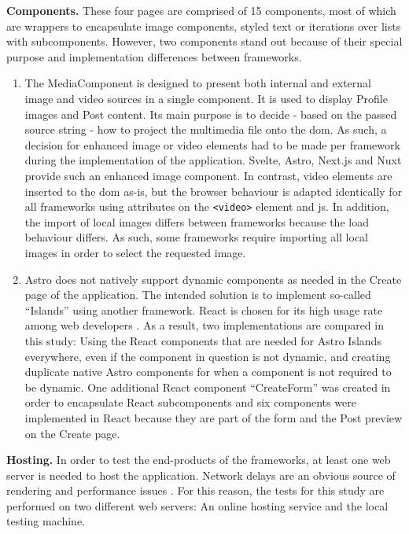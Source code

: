 \documentclass[a4paper, 12pt]{article}
\begin{document}
\textbf{Components.} These four pages are comprised of 15 components, most of which are wrappers to encapsulate image components, styled text or iterations over lists with subcomponents.
However, two components stand out because of their special purpose and implementation differences between frameworks.

\begin{enumerate}
  \item The MediaComponent is designed to present both internal and external image and video sources in a single component.
  It is used to display Profile images and Post content.
  Its main purpose is to decide - based on the passed source string - how to project the multimedia file onto the \acrshort{dom}.
  As such, a decision for enhanced image or video elements had to be made per framework during the implementation of the application.
  Svelte, Astro, Next.js and Nuxt provide such an enhanced image component.
  In contrast, video elements are inserted to the \acrshort{dom} as-is, but the browser behaviour is adapted identically for all frameworks using attributes on the \verb|<video>| element and \acrlong{js}.
  In addition, the import of local images differs between frameworks because the load behaviour differs.
  As such, some frameworks require importing all local images in order to select the requested image.
  \item Astro does not natively support dynamic components as needed in the Create page of the application.
  The intended solution is to implement so-called \enquote{Islands} using another framework.
  React is chosen for its high usage rate among web developers \citep{stateOfJs2023}.
  As a result, two implementations are compared in this study: Using the React components that are needed for Astro Islands everywhere, even if the component in question is not dynamic, and creating duplicate native Astro components for when a component is not required to be dynamic.
  One additional React component \enquote{CreateForm} was created in order to encapsulate React subcomponents and six components were implemented in React because they are part of the form and the Post preview on the Create page.
\end{enumerate}

\textbf{Hosting.} In order to test the end-products of the frameworks, at least one web server is needed to host the application.
Network delays are an obvious source of rendering and performance issues \citep{highperformancebrowsernetworking}.
For this reason, the tests for this study are performed on two different web servers: An online hosting service and the local testing machine.
\end{document}
